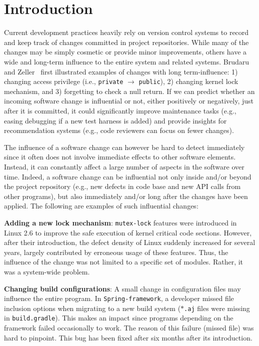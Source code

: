 \section{Introduction}
\label{sec:intro}

Current development practices heavily rely on version control systems to
record and keep track of changes committed in project repositories. While many
of the changes may be simply cosmetic or provide minor improvements, others
have a wide and long-term influence to the entire system and related systems.
Brudaru and Zeller~\cite{brudaru_what_2008} first illustrated examples of 
changes with long term-influence: 1) changing access privilege
(i.e., \texttt{private} $\rightarrow$ \texttt{public}), 2) changing kernel
lock mechanism, and 3) forgetting to check a null return. If we can predict
whether an incoming software change is influential or not, either positively
or negatively, just after it is committed, it could significantly improve
maintenance tasks (e.g., easing debugging if a new test harness is added) and provide insights for recommendation systems (e.g., code reviewers can focus on fewer changes).


The influence of a software change can however be hard to detect immediately since it often does
not involve immediate effects to other software elements. Instead, it can
constantly affect a large number of aspects in the software over time. Indeed,
a software change can be influential not only inside and/or beyond the project
repository (e.g., new defects in code base and new API calls from other
programs), but also immediately and/or  long after the changes have been
applied. The
following are examples of such influential changes:

{\bf Adding a new lock mechanism}: {\tt mutex-lock} features were introduced in 
Linux 2.6 to improve the safe execution of kernel critical code sections. However,
after their introduction, the defect density of Linux suddenly increased for 
several years, largely contributed by erroneous usage of these features.
Thus, the influence of the change was not limited to a specific set of modules.
Rather, it was a system-wide problem. 

{\bf Changing build configurations}: A small change in configuration files may
influence the entire program. In \texttt{Spring-framework}, a developer missed
file inclusion options when migrating to a new build system
(\texttt{$\ast$.aj} files were missing in \texttt{build.gradle}). 
This makes an impact since programs depending on the framework failed occasionally
to work. The reason of this failure (missed file) was hard to pinpoint. This bug 
has been fixed after six months after its introduction.


